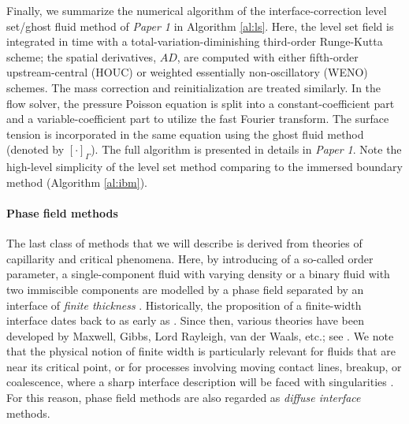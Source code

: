 Finally, we summarize the numerical algorithm of the interface-correction level set/ghost fluid method of \emph{Paper 1} in Algorithm \ref{al:ls}.
Here, the level set field is integrated in time with a total-variation-diminishing third-order Runge-Kutta scheme; the spatial derivatives, ${AD}$, are computed with either fifth-order upstream-central (HOUC) or weighted essentially non-oscillatory (WENO) schemes. The mass correction and reinitialization are treated similarly.
In the flow solver, the pressure Poisson equation is split into a constant-coefficient part and a variable-coefficient part to utilize the fast Fourier transform.
The surface tension is incorporated in the same equation using the ghost fluid method (denoted by $[\cdot]_\Gamma$).
The full algorithm is presented in details in \emph{Paper 1}. Note the high-level simplicity of the level set method comparing to the immersed boundary method (Algorithm \ref{al:ibm}).


\medskip
\paragraph{\bf Phase field methods}

The last class of methods that we will describe is derived from theories of capillarity and critical phenomena.
Here, by introducing of a so-called order parameter, a single-component fluid with varying density or a binary fluid with two immiscible components are modelled by a phase field separated by an interface of \emph{finite thickness} \citep{Anderson_McFadden_Wheeler}.
Historically, the proposition of a finite-width interface dates back to as early as \cite{Poisson1831}. Since then, various theories have been developed by Maxwell, Gibbs, Lord Rayleigh, van der Waals, etc.; see \eg \cite{van-der-waals1893, Cahn1961}.
We note that the physical notion of finite width is particularly relevant for fluids that are near its critical point, or for processes involving moving contact lines, breakup, or coalescence, where a sharp interface description will be faced with singularities \citep{Zhang_Mohseni_2018, Eggers1997}.
For this reason, phase field methods are also regarded as \emph{diffuse interface} methods.

